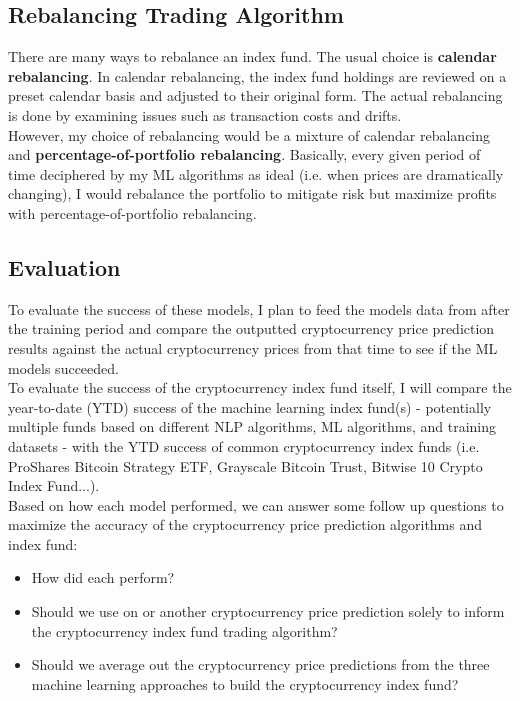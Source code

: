 \documentclass{article}
\begin{document}
\subsection{Rebalancing Trading Algorithm}
\label{sec:rebalancing}

There are many ways to rebalance an index fund. The usual choice is \textbf{calendar rebalancing}. In calendar rebalancing, the index fund holdings are reviewed on a preset calendar basis and adjusted to their original form. The actual rebalancing is done by examining issues such as transaction costs and drifts. \\

However, my choice of rebalancing would be a mixture of calendar rebalancing and \textbf{percentage-of-portfolio rebalancing}. Basically, every given period of time deciphered by my ML algorithms as ideal (i.e. when prices are dramatically changing), I would rebalance the portfolio to mitigate risk but maximize profits with percentage-of-portfolio rebalancing.

\subsection{Evaluation}
\label{sec:evaluation}

To evaluate the success of these models, I plan to feed the models data from after the training period and compare the outputted cryptocurrency price prediction results against the actual cryptocurrency prices from that time to see if the ML models succeeded. \\

To evaluate the success of the cryptocurrency index fund itself, I will compare the year-to-date (YTD) success of the machine learning index fund(s) - potentially multiple funds based on different NLP algorithms, ML algorithms, and training datasets - with the YTD success of common cryptocurrency index funds (i.e. ProShares Bitcoin Strategy ETF, Grayscale Bitcoin Trust, Bitwise 10 Crypto Index Fund...). \\

Based on how each model performed, we can answer some follow up questions to maximize the accuracy of the cryptocurrency price prediction algorithms and index fund:

\begin{itemize}
    \item How did each perform?
    \item Should we use on or another cryptocurrency price prediction solely to inform the cryptocurrency index fund trading algorithm?
    \item Should we average out the cryptocurrency price predictions from the three machine learning approaches to build the cryptocurrency index fund?
\end{itemize}
\end{document}
